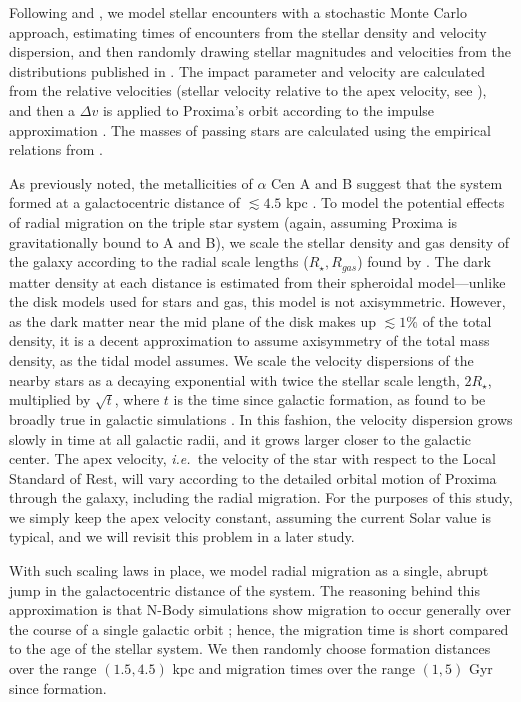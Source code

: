 \documentclass[preprint,12pt]{aastex}
\def\ie{{\it i.e.\ }}
\begin{document}
Following \cite{Heisler1987} and \cite{Rickman2008}, we model stellar
encounters with a stochastic Monte Carlo approach, estimating times 
of encounters from the stellar density and velocity dispersion, 
and then randomly drawing stellar magnitudes and velocities 
from the distributions published in \cite{Garciasanchez2001}. 
The impact parameter and velocity are calculated from the relative 
velocities (stellar velocity relative to the apex velocity, 
see \cite{Rickman2008}), and then a $\Delta v$ is applied to
Proxima's orbit according to the impulse approximation
\citep{Remy1985}. The masses of passing stars are calculated 
using the empirical relations from \cite{Reid2002}.

As previously noted, the metallicities of $\alpha$ Cen A and B 
suggest that the system formed at a galactocentric distance of 
$\lesssim 4.5$ kpc \citep{Loebman16}. To model the potential 
effects of radial migration on the triple star system (again, 
assuming Proxima is gravitationally bound to A and B), we 
scale the stellar density and gas density of the galaxy 
according to the radial scale lengths ($R_{\star}, R_{gas}$) found
by \cite{Kordopatis15}. The dark matter density at each distance 
is estimated from their spheroidal model---unlike the disk models 
used for stars and gas, this model is not axisymmetric. However, 
as the dark matter near the mid plane of the disk makes up 
$\lesssim 1\%$ of the total density, it is a decent approximation 
to assume axisymmetry of the total mass density, as the 
\cite{Heisler1986} tidal model assumes. We scale the velocity 
dispersions of the nearby stars as a decaying exponential 
with twice the stellar scale length, $2R_{\star}$, multiplied by 
$\sqrt{t}$, where $t$ is the time since galactic formation, as found 
to be broadly true in galactic simulations 
\citep{Minchev2012, Roskar2012}. In this fashion, the velocity 
dispersion grows slowly in time at all galactic radii, and it grows 
larger closer to the galactic center.
The apex velocity, \ie the velocity of the star with respect to
the Local Standard of Rest, will vary according to the detailed
orbital motion
of Proxima through the galaxy, including the radial migration.  For the
purposes of this study, we
simply keep the apex velocity constant, assuming the current Solar
value is typical, and we will revisit this problem in a later study.

With such scaling laws in place, we model radial migration 
as a single, abrupt jump in the galactocentric distance of the 
system. The reasoning behind this approximation is that N-Body 
simulations show migration to occur generally over the 
course of a single galactic orbit \citep{Roskar2010}; hence, the 
migration time is short compared to the age of the stellar system.
We then randomly choose formation distances over the range 
$(1.5,4.5)$ kpc and migration times over the range $(1,5)$ Gyr 
since formation.
\end{document}
